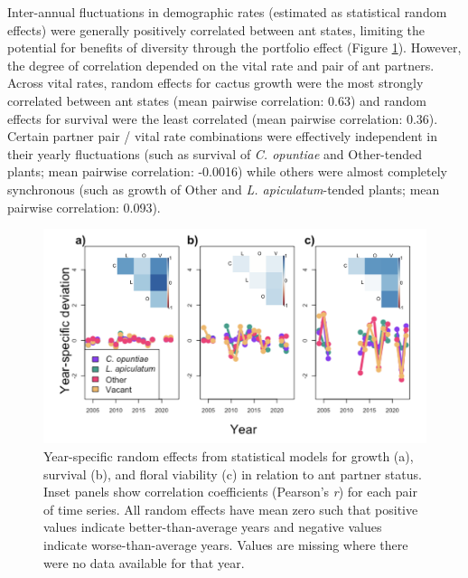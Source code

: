 \documentclass[11pt]{article}
\begin{document}
Inter-annual fluctuations in demographic rates (estimated as statistical random effects) were generally positively correlated between ant states, limiting the potential for benefits of diversity through the portfolio effect (Figure \ref{fig:Annual_Ant}).
However, the degree of correlation depended on the vital rate and pair of ant partners. 
Across vital rates, random effects for cactus growth were the most strongly correlated between ant states (mean pairwise correlation: 0.63) and random effects for survival were the least correlated (mean pairwise correlation: 0.36).  
Certain partner pair / vital rate combinations were effectively independent in their yearly fluctuations (such as survival of \textit{C. opuntiae} and Other-tended plants; mean pairwise correlation: -0.0016) while others were almost completely synchronous (such as growth of Other and \textit{L. apiculatum}-tended plants; mean pairwise correlation: 0.093). 

\begin{figure}[H]
	\includegraphics[width=0.75\linewidth]{Figures/ant_RFX.png}
	\caption{Year-specific random effects from statistical models for growth (a), survival (b), and floral viability (c) in relation to ant partner status. Inset panels show correlation coefficients (Pearson's \textit{r}) for each pair of time series. All random effects have mean zero such that positive values indicate better-than-average years and negative values indicate worse-than-average years. Values are missing where there were no data available for that year.}
	\label{fig:Annual_Ant}
\end{figure}
\end{document}
